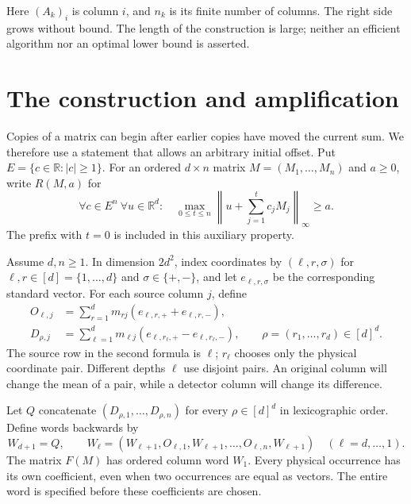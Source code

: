 \documentclass[11pt]{article}
\newcommand{\R}{\mathbb R}
\begin{document}
Here $(A_k)_i$ is column $i$, and $n_k$ is its finite number of columns.
The right side grows without bound. The length of the construction is
large; neither an efficient algorithm nor an optimal lower bound is asserted.

\section{The construction and amplification}

Copies of a matrix can begin after earlier copies have moved the current
sum. We therefore use a statement that allows an arbitrary initial offset.
Put $E=\{c\in\R:|c|\ge1\}$. For an ordered $d\times n$ matrix
$M=(M_1,\ldots,M_n)$ and $a\ge0$, write $R(M,a)$ for
\begin{equation}\label{eq:robust}
\forall c\in E^n\ \forall u\in\R^d:
\quad\max_{0\le t\le n}\left\|u+\sum_{j=1}^t c_jM_j\right\|_\infty\ge a.
\end{equation}
The prefix with $t=0$ is included in this auxiliary property.

Assume $d,n\ge1$. In dimension $2d^2$, index coordinates by
$(\ell,r,\sigma)$ for $\ell,r\in[d]=\{1,\ldots,d\}$ and
$\sigma\in\{+,-\}$, and let $e_{\ell,r,\sigma}$ be the corresponding
standard vector. For each source column $j$, define
\begin{align}
O_{\ell,j}&=\sum_{r=1}^d m_{rj}
 (e_{\ell,r,+}+e_{\ell,r,-}),\label{eq:original}\\
D_{\rho,j}&=\sum_{\ell=1}^d m_{\ell j}
 (e_{\ell,r_\ell,+}-e_{\ell,r_\ell,-}),
 \qquad \rho=(r_1,\ldots,r_d)\in[d]^d.\label{eq:detector}
\end{align}
The source row in the second formula is $\ell$; $r_\ell$ chooses only
the physical coordinate pair. Different depths $\ell$ use disjoint pairs.
An original column will change the mean of a pair, while a detector
column will change its difference.

Let $Q$ concatenate $(D_{\rho,1},\ldots,D_{\rho,n})$ for every
$\rho\in[d]^d$ in lexicographic order. Define words backwards by
\begin{equation}\label{eq:word}
W_{d+1}=Q,\qquad
W_\ell=(W_{\ell+1},O_{\ell,1},W_{\ell+1},\ldots,
 O_{\ell,n},W_{\ell+1})\quad(\ell=d,\ldots,1).
\end{equation}
The matrix $F(M)$ has ordered column word $W_1$. Every physical occurrence
has its own coefficient, even when two occurrences are equal as vectors.
The entire word is specified before these coefficients are chosen.
\end{document}
